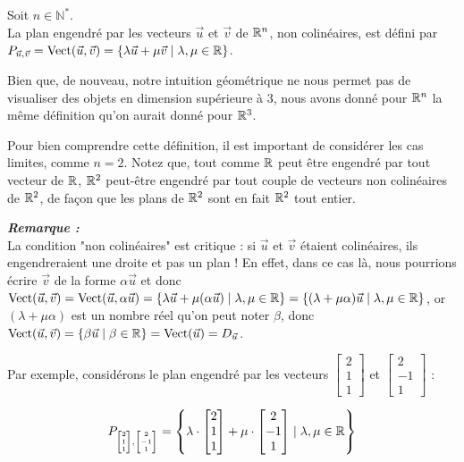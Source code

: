 \begin{boxdef} 
 Soit $n \in \mathbb{N}^*$.\\
 La plan engendré par les vecteurs $\vec{u}$ et $\vec{v}$ de $\mathbb{R}^n$, non colinéaires, est défini par $P_{\vec{u},\vec{v}} = \operatorname{Vect}(\vec{u}, \vec{v}) = \{ \lambda \vec{u} + \mu \vec{v} \mid \lambda, \mu \in \mathbb{R}\}$.
\end{boxdef}

Bien que, de nouveau, notre intuition géométrique ne nous permet pas de visualiser des objets en dimension supérieure à $3$, nous avons donné pour   $\mathbb{R}^n$ la même définition qu'on aurait donné pour $\mathbb{R}^3$.

Pour bien comprendre cette définition, il est important de considérer les cas limites, comme $n=2$. Notez que, tout comme $\mathbb{R}$ peut être engendré par tout vecteur de $\mathbb{R}$, $\mathbb{R}^2$ peut-être engendré par tout couple de vecteurs non colinéaires de $\mathbb{R}^2$, de façon que les plans de $\mathbb{R}^2$ sont en fait $\mathbb{R}^2$ tout entier.

\textit{\textbf{Remarque :}}\\
La condition "non colinéaires" est critique : si $\vec{u}$ et $\vec{v}$ étaient colinéaires, ils engendreraient une droite et pas un plan ! En effet, dans ce cas là, nous pourrions écrire  $\vec{v}$ de la forme $\alpha\vec{u}$ et donc $\operatorname{Vect}(\vec{u},\vec{v}) = \operatorname{Vect}(\vec{u},\alpha\vec{u}) = \{\lambda\vec{u}+\mu(\alpha\vec{u}) \mid \lambda, \mu \in \mathbb{R}\} = \{(\lambda+\mu\alpha)\vec{u} \mid \lambda, \mu\in\mathbb{R}\}$, or $(\lambda+\mu\alpha)$ est un nombre réel qu'on peut noter $\beta$, donc $\operatorname{Vect}(\vec{u},\vec{v}) = \{\beta\vec{u}\mid\beta\in\mathbb{R}\} = \operatorname{Vect}(\vec{u}) = D_{\vec{u}}$.

Par exemple, considérons le plan engendré par les vecteurs $\begin{bmatrix}2\\1\\1\end{bmatrix}$ et $\begin{bmatrix}2\\-1\\1\end{bmatrix}$ :

\[
P_{\tiny \begin{bmatrix}2\\1\\1\end{bmatrix},\begin{bmatrix}2\\-1\\1\end{bmatrix}} = \left\{\lambda\cdot\begin{bmatrix}2\\1\\1\end{bmatrix}+\mu\cdot\begin{bmatrix}2\\-1\\1\end{bmatrix}\mid\lambda,\mu\in\mathbb{R}\right\}
\]

